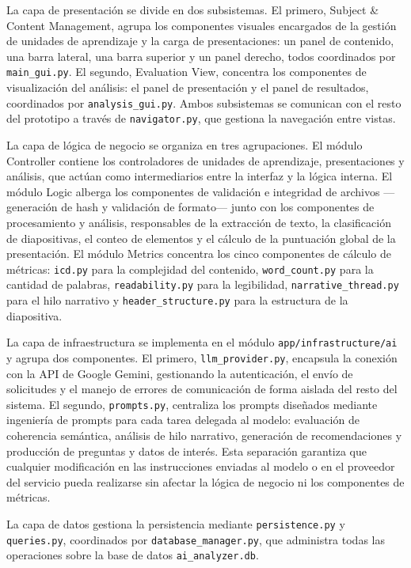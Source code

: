 \documentclass[11pt]{article}
\begin{document}
La capa de presentación se divide en dos subsistemas. El primero, Subject \& Content Management, agrupa los componentes visuales encargados de la gestión de unidades de aprendizaje y la carga de presentaciones: un panel de contenido, una barra lateral, una barra superior y un panel derecho, todos coordinados por \texttt{main\_gui.py}. El segundo, Evaluation View, concentra los componentes de visualización del análisis: el panel de presentación y el panel de resultados, coordinados por \texttt{analysis\_gui.py}. Ambos subsistemas se comunican con el resto del prototipo a través de \texttt{navigator.py}, que gestiona la navegación entre vistas.

La capa de lógica de negocio se organiza en tres agrupaciones. El módulo Controller contiene los controladores de unidades de aprendizaje, presentaciones y análisis, que actúan como intermediarios entre la interfaz y la lógica interna. El módulo Logic alberga los componentes de validación e integridad de archivos —generación de hash y validación de formato— junto con los componentes de procesamiento y análisis, responsables de la extracción de texto, la clasificación de diapositivas, el conteo de elementos y el cálculo de la puntuación global de la presentación. El módulo Metrics concentra los cinco componentes de cálculo de métricas: \texttt{icd.py} para la complejidad del contenido, \texttt{word\_count.py} para la cantidad de palabras, \texttt{readability.py} para la legibilidad, \texttt{narrative\_thread.py} para el hilo narrativo y \texttt{header\_structure.py} para la estructura de la diapositiva.

La capa de infraestructura se implementa en el módulo \texttt{app/infrastructure/ai} y agrupa dos componentes. El primero, \texttt{llm\_provider.py}, encapsula la conexión con la API de Google Gemini, gestionando la autenticación, el envío de solicitudes y el manejo de errores de comunicación de forma aislada del resto del sistema. El segundo, \texttt{prompts.py}, centraliza los prompts diseñados mediante ingeniería de prompts para cada tarea delegada al modelo: evaluación de coherencia semántica, análisis de hilo narrativo, generación de recomendaciones y producción de preguntas y datos de interés. Esta separación garantiza que cualquier modificación en las instrucciones enviadas al modelo o en el proveedor del servicio pueda realizarse sin afectar la lógica de negocio ni los componentes de métricas.

La capa de datos gestiona la persistencia mediante \texttt{persistence.py} y \texttt{queries.py}, coordinados por \texttt{database\_manager.py}, que administra todas las operaciones sobre la base de datos \texttt{ai\_analyzer.db}.
\end{document}
